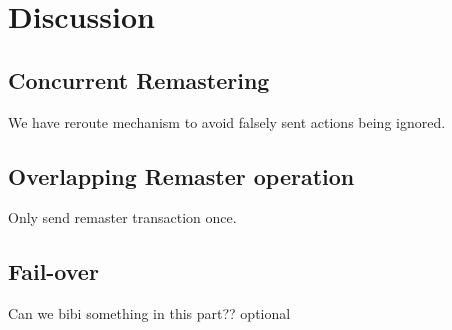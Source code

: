 \section{Discussion}

\subsection{Concurrent Remastering}
We have reroute mechanism to avoid falsely sent actions being ignored.

\subsection{Overlapping Remaster operation}
Only send remaster transaction once.


\subsection{Fail-over}
Can we bibi something in this part?? optional